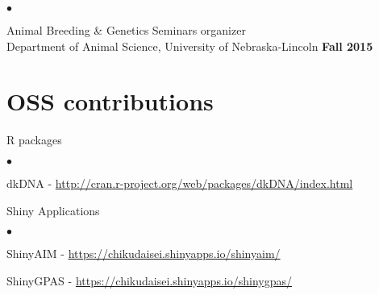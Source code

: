 \documentclass[margin,line,10pt]{res}
\newenvironment{list1}{
  \begin{list}{\ding{113}}{%
      \setlength{\itemsep}{0in}
      \setlength{\parsep}{0in} \setlength{\parskip}{0in}
      \setlength{\topsep}{0in} \setlength{\partopsep}{0in} 
      \setlength{\leftmargin}{0.17in}}}{\end{list}}
\newenvironment{list2}{
  \begin{list}{$\bullet$}{%
      \setlength{\itemsep}{0in}
      \setlength{\parsep}{0in} \setlength{\parskip}{0in}
      \setlength{\topsep}{0in} \setlength{\partopsep}{0in} 
      \setlength{\leftmargin}{0.2in}}}{\end{list}}
\begin{document}
\begin{resume}
\begin{list2}
\item Animal Breeding \& Genetics Seminars organizer \\
  Department of Animal Science, University of Nebraska-Lincoln   \hfill \textbf{Fall 2015}\\
\end{list2}






\vspace{0.5cm}
\section{\sc OSS contributions} 
\begin{list1}
\item[] R packages
\begin{list2}
\item dkDNA - \textcolor{blue}{\href{http://cran.r-project.org/web/packages/dkDNA/index.html}{http://cran.r-project.org/web/packages/dkDNA/index.html}}
\end{list2}


\vspace{0.3cm}
\item[] Shiny Applications
  \begin{list2}
  \item ShinyAIM - \textcolor{blue}{\href{https://chikudaisei.shinyapps.io/shinyaim/}{https://chikudaisei.shinyapps.io/shinyaim/}}

    \vspace{0.3cm}
    
\item ShinyGPAS - \textcolor{blue}{\href{https://chikudaisei.shinyapps.io/shinygpas/}{https://chikudaisei.shinyapps.io/shinygpas/}} 
\end{list2}




\end{list1}
\end{resume}
\end{document}
